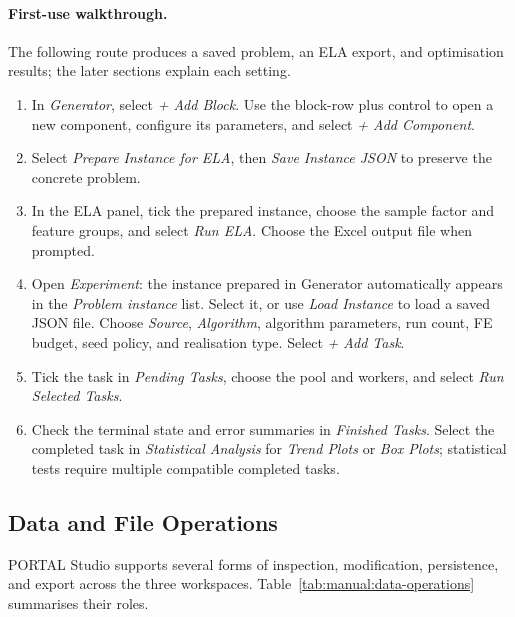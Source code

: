 \documentclass[journal,onecolumn]{IEEEtran}
\begin{document}
\paragraph{First-use walkthrough.}
The following route produces a saved problem, an ELA export, and optimisation results; the later sections explain each setting.
\begin{enumerate}
\item In \emph{Generator}, select \emph{+ Add Block}. Use the block-row plus control to open a new component, configure its parameters, and select \emph{+ Add Component}.
\item Select \emph{Prepare Instance for ELA}, then \emph{Save Instance JSON} to preserve the concrete problem.
\item In the ELA panel, tick the prepared instance, choose the sample factor and feature groups, and select \emph{Run ELA}. Choose the Excel output file when prompted.
\item Open \emph{Experiment}: the instance prepared in Generator automatically appears in the \emph{Problem instance} list. Select it, or use \emph{Load Instance} to load a saved JSON file. Choose \emph{Source}, \emph{Algorithm}, algorithm parameters, run count, FE budget, seed policy, and realisation type. Select \emph{+ Add Task}.
\item Tick the task in \emph{Pending Tasks}, choose the pool and workers, and select \emph{Run Selected Tasks}.
\item Check the terminal state and error summaries in \emph{Finished Tasks}. Select the completed task in \emph{Statistical Analysis} for \emph{Trend Plots} or \emph{Box Plots}; statistical tests require multiple compatible completed tasks.
\end{enumerate}

\subsection{Data and File Operations}
\label{ssec:manual:data-operations}

PORTAL Studio supports several forms of inspection, modification, persistence, and export across the three workspaces. Table~\ref{tab:manual:data-operations} summarises their roles.
\end{document}
